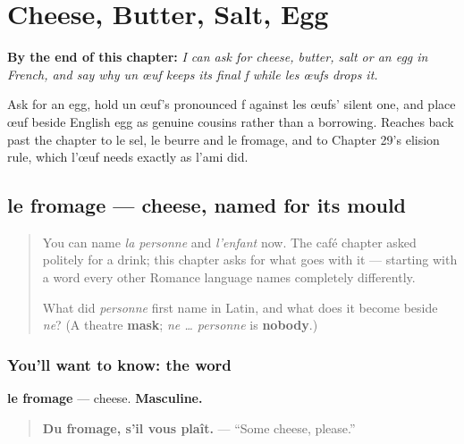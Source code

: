 
\chapter{Cheese, Butter, Salt, Egg}
\label{ch:fr-cheese-butter-salt-egg}

\begin{chapteropening}
\textbf{By the end of this chapter:} \emph{I can ask for cheese, butter, salt or an egg in French, and say why un œuf keeps its final f while les œufs drops it.}

Ask for an egg, hold un œuf's pronounced f against les œufs' silent one, and place œuf beside English egg as genuine cousins rather than a borrowing. Reaches back past the chapter to le sel, le beurre and le fromage, and to Chapter 29's elision rule, which l'œuf needs exactly as l'ami did.
\end{chapteropening}

\section[le fromage]{le fromage — cheese, named for its mould}

\label{lesson:FR-C30-fromage}



\begin{quote}
You can name \emph{la personne} and \emph{l'enfant} now. The café chapter asked politely for a drink; this chapter asks for what goes with it — starting with a word every other Romance language names completely differently.

What did \emph{personne} first name in Latin, and what does it become beside \emph{ne}? (A theatre \textbf{mask}; \emph{ne … personne} is \textbf{nobody}.)
\end{quote}

\subsection*{You'll want to know: the word}
\textbf{le fromage} — cheese. \textbf{Masculine.}

\begin{quote}
\textbf{Du fromage, s'il vous plaît.} — \textquotedblleft{}Some cheese, please.\textquotedblright{}
\end{quote}

